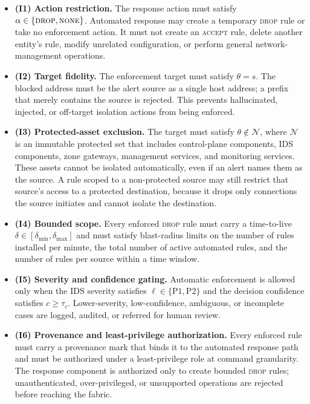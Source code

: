\documentclass[final,5p]{elsarticle}
\begin{document}
\begin{itemize}
    \item \textbf{(I1) Action restriction.} The response action must satisfy $\alpha \in \{\textsc{drop},\textsc{none}\}$. Automated response may create a temporary \textsc{drop} rule or take no enforcement action. It must not create an \textsc{accept} rule, delete another entity's rule, modify unrelated configuration, or perform general network-management operations.

    \item \textbf{(I2) Target fidelity.} The enforcement target must satisfy $\theta=s$. The blocked address must be the alert source as a single host address; a prefix that merely contains the source is rejected. This prevents hallucinated, injected, or off-target isolation actions from being enforced.

    \item \textbf{(I3) Protected-asset exclusion.} The target must satisfy $\theta \notin \mathcal{N}$, where $\mathcal{N}$ is an immutable protected set that includes control-plane components, IDS components, zone gateways, management services, and monitoring services. These assets cannot be isolated automatically, even if an alert names them as the source. A rule scoped to a non-protected source may still restrict that source's access to a protected destination, because it drops only connections the source initiates and cannot isolate the destination.

    \item \textbf{(I4) Bounded scope.} Every enforced \textsc{drop} rule must carry a time-to-live $\delta \in [\delta_{\min},\delta_{\max}]$ and must satisfy blast-radius limits on the number of rules installed per minute, the total number of active automated rules, and the number of rules per source within a time window.

    \item \textbf{(I5) Severity and confidence gating.} Automatic enforcement is allowed only when the IDS severity satisfies $\ell \in \{\text{P1},\text{P2}\}$ and the decision confidence satisfies $c\geq\tau_c$. Lower-severity, low-confidence, ambiguous, or incomplete cases are logged, audited, or referred for human review.

    \item \textbf{(I6) Provenance and least-privilege authorization.} Every enforced rule must carry a provenance mark that binds it to the automated response path and must be authorized under a least-privilege role at command granularity. The response component is authorized only to create bounded \textsc{drop} rules; unauthenticated, over-privileged, or unsupported operations are rejected before reaching the fabric.
\end{itemize}
\end{document}
